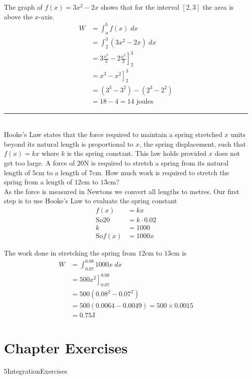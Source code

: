\solution The graph of $f (x) =3 x^{2} -2 x$ shows that for the interval $\left [2 ,3\right ]$ the area is above the $x$-axis.
\begin{align*}W &  = \int _{a}^{b}f (x)\; d x \\
 &  = \int _{2}^{3}\left (3 x^{2} -2 x\right )\; d x \\
 &  = \left .3 \frac{x^{3}}{3} -2 \frac{x^{2}}{2}\right ]_{2}^{3} \\
 &  = \left .x^{3} -x^{2}\right ]_{2}^{3} \\
 &  = \left (3^{3} -3^{2}\right ) -\left (2^{3} -2^{2}\right ) \\
 &  = 18 -4 =14\text{ joules}\end{align*}
\rule{6.8cm}{0.5pt}\\
\example Hooke's Law states that the force required to maintain a spring stretched $x$ units beyond its natural length is proportional to $x$, the spring displacement, such that $f (x) =k x$ where $k$ is the spring constant. This law holds provided $x$ does not get too large. A force of $20 \mbox{N}$ is required to stretch a spring from its natural length of $5 \mbox{cm}$ to a length of $7 \mbox{cm}$. How much work is required to stretch the spring from a length of $12 \mbox{cm}$ to $13 \mbox{cm}$? \\

\solution As the force is measured in Newtons we convert all lengths to metres. Our first step is to use Hooke's Law to evaluate the spring constant
\begin{align*}f (x) &  = k x \\
\text{So}20 &  = k \cdot 0.02 \\
k &  = 1000 \\
\text{So}f (x) &  = 1000 x\end{align*}

The work done in stretching the spring from $12 \mbox{cm}$ to $13 \mbox{cm}$ is
\begin{align*}W &  = \int _{0.07}^{0.08}1000 x\; d x \\
 &  = \left .500 x^{2}\right ]_{0.07}^{0.08} \\
 &  = 500 \left (0.08^{2} -0.07^{2}\right ) \\
 &  = 500 \left (0.0064 -0.0049\right ) =500 \times 0.0015 \\
 &  = 0.75\text{}\mbox{J}\end{align*}

\clearpage
\section{Chapter Exercises}
{5IntegrationExercises}


 



